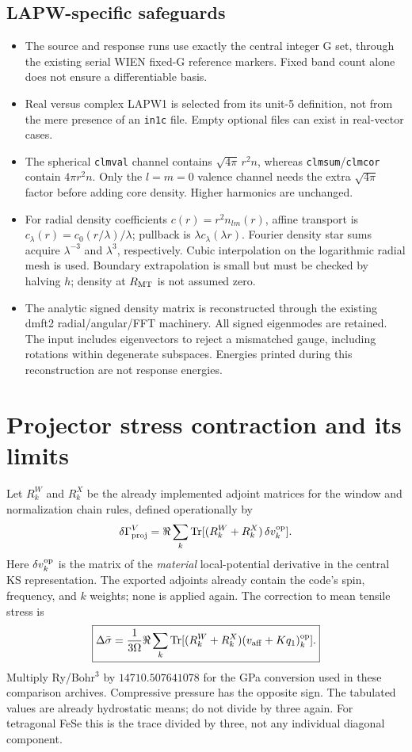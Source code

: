 \documentclass[11pt]{article}
\newcommand{\Tr}{\operatorname{Tr}}
\begin{document}
\subsection*{LAPW-specific safeguards}
\begin{itemize}
\item The source and response runs use exactly the central integer G set,
through the existing serial WIEN fixed-G reference markers. Fixed band
count alone does not ensure a differentiable basis.
\item Real versus complex LAPW1 is selected from its unit-5 definition,
not from the mere presence of an \texttt{in1c} file. Empty optional files
can exist in real-vector cases.
\item The spherical \texttt{clmval} channel contains
$\sqrt{4\pi}\,r^2 n$, whereas \texttt{clmsum}/\texttt{clmcor} contain
$4\pi r^2 n$. Only the $l=m=0$ valence channel needs the extra
$\sqrt{4\pi}$ factor before adding core density. Higher harmonics are
unchanged.
\item For radial density coefficients $c(r)=r^2n_{lm}(r)$, affine transport
is $c_\lambda(r)=c_0(r/\lambda)/\lambda$; pullback is
$\lambda c_\lambda(\lambda r)$. Fourier density star sums acquire
$\lambda^{-3}$ and $\lambda^3$, respectively. Cubic interpolation on the
logarithmic radial mesh is used. Boundary extrapolation is small but must
be checked by halving $h$; density at $R_{\rm MT}$ is not assumed zero.
\item The analytic signed density matrix is reconstructed through the
existing dmft2 radial/angular/FFT machinery. All signed eigenmodes are
retained. The input includes eigenvectors to reject a mismatched gauge,
including rotations within degenerate subspaces. Energies printed during
this reconstruction are not response energies.
\end{itemize}

\section{Projector stress contraction and its limits}
Let $R_k^{W}$ and $R_k^{X}$ be the already implemented adjoint matrices for
the window and normalization chain rules, defined operationally by
\begin{equation}
 \delta\Gamma_{\rm proj}^{V}
 =\Re\sum_k\Tr[(R_k^{W}+R_k^{X})\,\delta v_k^{\rm op}].
\end{equation}
Here $\delta v_k^{\rm op}$ is the matrix of the \emph{material} local-potential
derivative in the central KS representation. The exported adjoints already
contain the code's spin, frequency, and $k$ weights; none is applied again.
The correction to mean tensile stress is
\begin{equation}
 \boxed{\Delta\bar\sigma=
 \frac{1}{3\Omega}\Re\sum_k\Tr[(R_k^{W}+R_k^{X})(v_{\rm aff}+Kq_1)_k^{\rm op}].}
\end{equation}
Multiply Ry/Bohr$^3$ by $14710.507641078$ for the GPa conversion used in
these comparison archives. Compressive pressure has the opposite sign.
The tabulated values are already hydrostatic means; do not divide by three
again. For tetragonal FeSe this is the trace divided by three, not any
individual diagonal component.
\end{document}
